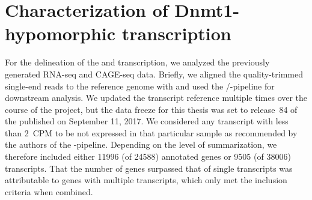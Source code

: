 
\section{Characterization of Dnmt1-hypomorphic transcription}
\label{chap:r:transcription:intro}\label{chap:r:transcription:expressionoverall}

For the delineation of the \dnmtwt and \dnmtchip transcription, we analyzed the previously generated RNA-seq and CAGE-seq data. Briefly, we aligned the  quality-trimmed single-end reads to the \mmnine reference genome with \cite{Bushnell2014} and used the /-pipeline for downstream analysis. We updated the transcript reference multiple times over the course of the project, but the data freeze for this thesis was set to release~\num{84} of the  published on September 11, 2017. We considered any transcript with less than \SI{2}{CPM} to be not expressed in that particular sample as recommended by the authors of the -pipeline\cite{Chen2016c}. Depending on the level of summarization, we therefore included either \num{11996} (of \num{24588}) annotated genes or \num{9505} (of \num{38006}) transcripts. That the number of genes surpassed that of single transcripts was attributable to genes with multiple transcripts, which only met the inclusion criteria when combined. 

